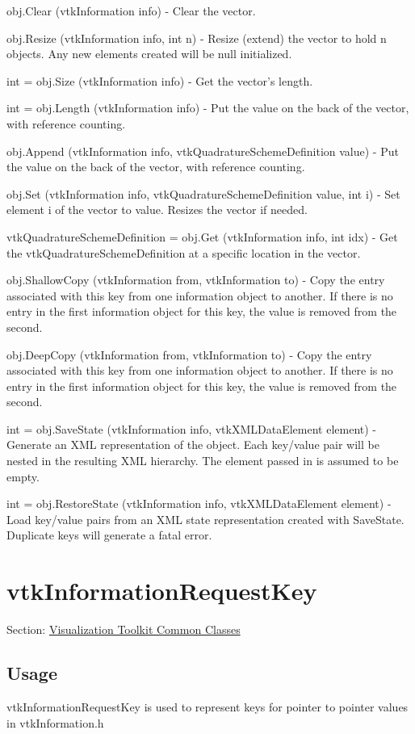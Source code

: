\begin{DoxyItemize}
\item {\ttfamily obj.\-Clear (vtk\-Information info)} -\/ Clear the vector.  
\item {\ttfamily obj.\-Resize (vtk\-Information info, int n)} -\/ Resize (extend) the vector to hold n objects. Any new elements created will be null initialized.  
\item {\ttfamily int = obj.\-Size (vtk\-Information info)} -\/ Get the vector's length.  
\item {\ttfamily int = obj.\-Length (vtk\-Information info)} -\/ Put the value on the back of the vector, with reference counting.  
\item {\ttfamily obj.\-Append (vtk\-Information info, vtk\-Quadrature\-Scheme\-Definition value)} -\/ Put the value on the back of the vector, with reference counting.  
\item {\ttfamily obj.\-Set (vtk\-Information info, vtk\-Quadrature\-Scheme\-Definition value, int i)} -\/ Set element i of the vector to value. Resizes the vector if needed.  
\item {\ttfamily vtk\-Quadrature\-Scheme\-Definition = obj.\-Get (vtk\-Information info, int idx)} -\/ Get the vtk\-Quadrature\-Scheme\-Definition at a specific location in the vector.  
\item {\ttfamily obj.\-Shallow\-Copy (vtk\-Information from, vtk\-Information to)} -\/ Copy the entry associated with this key from one information object to another. If there is no entry in the first information object for this key, the value is removed from the second.  
\item {\ttfamily obj.\-Deep\-Copy (vtk\-Information from, vtk\-Information to)} -\/ Copy the entry associated with this key from one information object to another. If there is no entry in the first information object for this key, the value is removed from the second.  
\item {\ttfamily int = obj.\-Save\-State (vtk\-Information info, vtk\-X\-M\-L\-Data\-Element element)} -\/ Generate an X\-M\-L representation of the object. Each key/value pair will be nested in the resulting X\-M\-L hierarchy. The element passed in is assumed to be empty.  
\item {\ttfamily int = obj.\-Restore\-State (vtk\-Information info, vtk\-X\-M\-L\-Data\-Element element)} -\/ Load key/value pairs from an X\-M\-L state representation created with Save\-State. Duplicate keys will generate a fatal error.  
\end{DoxyItemize}\hypertarget{vtkcommon_vtkinformationrequestkey}{}\section{vtk\-Information\-Request\-Key}\label{vtkcommon_vtkinformationrequestkey}
Section\-: \hyperlink{sec_vtkcommon}{Visualization Toolkit Common Classes} \hypertarget{vtkwidgets_vtkxyplotwidget_Usage}{}\subsection{Usage}\label{vtkwidgets_vtkxyplotwidget_Usage}
vtk\-Information\-Request\-Key is used to represent keys for pointer to pointer values in vtk\-Information.\-h

